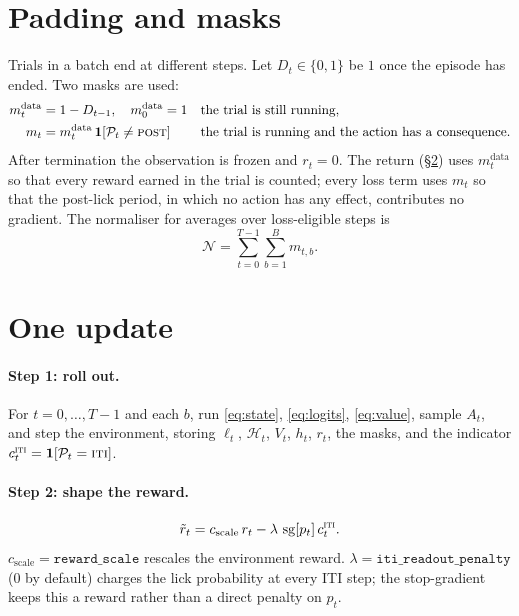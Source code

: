\documentclass[11pt]{article}
\newcommand{\sg}{\operatorname{sg}}
\newcommand{\1}{\mathbf{1}}
\begin{document}
\section{Padding and masks}\label{sec:mask}

Trials in a batch end at different steps. Let $D_t \in \{0,1\}$ be $1$ once the episode
has ended. Two masks are used:
\begin{align}
  m^{\mathrm{data}}_t &= 1 - D_{t-1}, \quad m^{\mathrm{data}}_0 = 1
    && \text{the trial is still running}, \\
  m_t &= m^{\mathrm{data}}_t\,\1[\mathcal{P}_t \ne \textsc{post}]
    && \text{the trial is running and the action has a consequence}.
\end{align}
After termination the observation is frozen and $r_t = 0$. The return
(\S\ref{sec:update}) uses $m^{\mathrm{data}}_t$ so that every reward earned in the trial is
counted; every loss term uses $m_t$ so that the post-lick period, in which no action has
any effect, contributes no gradient. The normaliser for averages over loss-eligible steps is
\begin{equation}
  \mathcal{N} = \sum_{t=0}^{T-1}\sum_{b=1}^{B} m_{t,b}.
\end{equation}

\section{One update}\label{sec:update}

\paragraph{Step 1: roll out.} For $t = 0,\dots,T-1$ and each $b$, run
\eqref{eq:state}, \eqref{eq:logits}, \eqref{eq:value}, sample $A_t$, and step the
environment, storing $\ell_t$, $\mathcal{H}_t$, $V_t$, $h_t$, $r_t$, the masks, and the
indicator $c^{\textsc{iti}}_t = \1[\mathcal{P}_t = \textsc{iti}]$.

\paragraph{Step 2: shape the reward.}
\begin{equation}
  \tilde r_t = c_{\mathrm{scale}}\, r_t - \lambda\, \sg[p_t]\, c^{\textsc{iti}}_t .
  \label{eq:shaped}
\end{equation}
$c_{\mathrm{scale}} = \texttt{reward\_scale}$ rescales the environment reward. $\lambda =
\texttt{iti\_readout\_penalty}$ (0 by default) charges the lick probability at every ITI
step; the stop-gradient keeps this a reward rather than a direct penalty on $p_t$.
\end{document}
